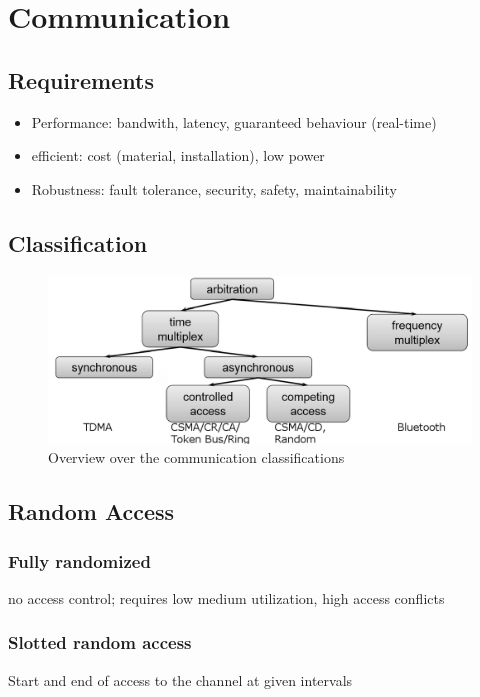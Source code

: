 


\section{Communication}

\subsection{Requirements}
\begin{itemize}[noitemsep]
\item Performance: bandwith, latency, guaranteed behaviour (real-time)
\item efficient: cost (material, installation), low power
\item Robustness: fault tolerance, security, safety, maintainability
\end{itemize}

\subsection{Classification}

\begin{figure}[ht]
	\centering
  	\includegraphics[scale=0.4]{img/8_classification.png}
	\caption{Overview over the communication classifications}
	\label{fig_classification}
\end{figure}


\subsection{Random Access}
\subsubsection{Fully randomized}
no access control; requires low medium utilization, high access conflicts
\subsubsection{Slotted random access}
Start and end of access to the channel at given intervals

